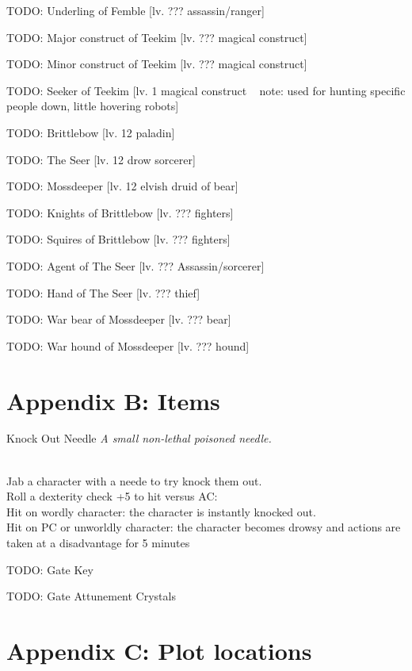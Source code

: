 \documentclass[10pt,twoside,twocolumn]{article}
\begin{document}
TODO: Underling of Femble [lv. ??? assassin/ranger]

TODO: Major construct of Teekim [lv. ??? magical construct]

TODO: Minor construct of Teekim [lv. ??? magical construct]

TODO: Seeker of Teekim [lv. 1 magical construct ~ note: used for hunting specific people down, little hovering robots]

TODO: Brittlebow [lv. 12 paladin]

TODO: The Seer [lv. 12 drow sorcerer]

TODO: Mossdeeper [lv. 12 elvish druid of bear]

TODO: Knights of Brittlebow [lv. ??? fighters]

TODO: Squires of Brittlebow [lv. ??? fighters]

TODO: Agent of The Seer [lv. ??? Assassin/sorcerer]

TODO: Hand of The Seer [lv. ??? thief]

TODO: War bear of Mossdeeper [lv. ??? bear]

TODO: War hound of Mossdeeper [lv. ??? hound]

\clearpage

\section{Appendix B: Items}

\begin{itembox}{Knock Out Needle}
	\textit{A small non-lethal poisoned needle.}\\
	\hline \\[1mm]
	\begin{itemaction}
		Jab a character with a neede to try knock them out.\\
		Roll a dexterity check +5 to hit versus AC:\\
		Hit on wordly character: the character is instantly knocked out.\\
		Hit on PC or unworldly character: the character becomes drowsy and actions are taken at a disadvantage for 5 minutes
	\end{itemaction}
\end{itembox}

TODO: Gate Key

TODO: Gate Attunement Crystals

\clearpage

\section{Appendix C: Plot locations}
\end{document}
